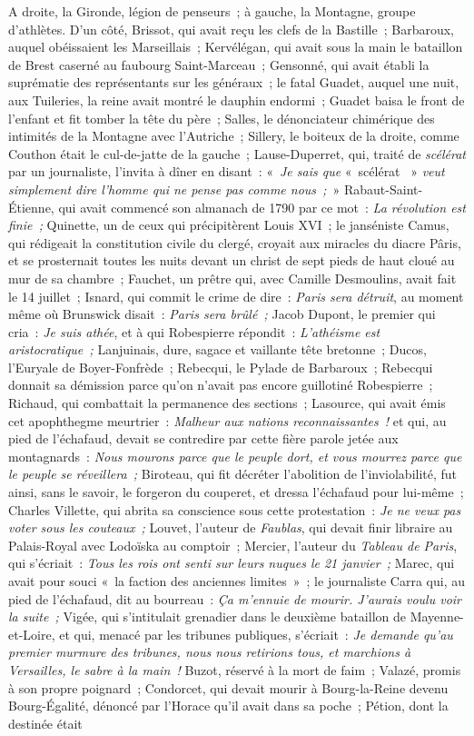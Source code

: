 \documentclass[french,twoside]{book} %
\begin{document}
A droite, la Gironde, légion de penseurs ; à gauche, la Montagne, groupe d’athlètes. D’un côté, Brissot, qui avait reçu les clefs de la Bastille ; Barbaroux, auquel obéissaient les Marseillais ; Kervélégan, qui avait sous la main le bataillon de Brest caserné au faubourg Saint-Marceau ; Gensonné, qui avait établi la suprématie des représentants sur les généraux ; le fatal Guadet, auquel une nuit, aux Tuileries, la reine avait montré le dauphin endormi ; Guadet baisa le front de l’enfant et fit tomber la tête du père ; Salles, le dénonciateur chimérique des intimités de la Montagne avec l’Autriche ; Sillery, le boiteux de la droite, comme Couthon était le cul-de-jatte de la gauche ; Lause-Duperret, qui, traité de \emph{scélérat} par un journaliste, l’invita à dîner en disant : « \emph{Je sais que} « scélérat  » \emph{veut simplement dire l’homme qui ne pense pas comme nous ;} » Rabaut-Saint-Étienne, qui avait commencé son almanach de 1790 par ce mot : \emph{La révolution est finie ;} Quinette, un de ceux qui précipitèrent Louis XVI ; le janséniste Camus, qui rédigeait la constitution civile du clergé, croyait aux miracles du diacre Pâris, et se prosternait toutes les nuits devant un christ de sept pieds de haut cloué au mur de sa chambre ; Fauchet, un prêtre qui, avec Camille Desmoulins, avait fait le 14 juillet ; Isnard, qui commit le crime de dire : \emph{Paris sera détruit}, au moment même où Brunswick disait : \emph{Paris sera brûlé ;} Jacob Dupont, le premier qui cria : \emph{Je suis athée}, et à qui Robespierre répondit : \emph{L’athéisme est aristocratique ;} Lanjuinais, dure, sagace et vaillante tête bretonne ; Ducos, l’Euryale de Boyer-Fonfrède ; Rebecqui, le Pylade de Barbaroux ; Rebecqui donnait sa démission parce qu’on n’avait pas encore guillotiné Robespierre ; Richaud, qui combattait la permanence des sections ; Lasource, qui avait émis cet apophthegme meurtrier : \emph{Malheur aux nations reconnaissantes !} et qui, au pied de l’échafaud, devait se contredire par cette fière parole jetée aux montagnards : \emph{Nous mourons parce que le peuple dort, et vous mourrez parce que le peuple se réveillera ;} Biroteau, qui fit décréter l’abolition de l’inviolabilité, fut ainsi, sans le savoir, le forgeron du couperet, et dressa l’échafaud pour lui-même ; Charles Villette, qui abrita sa conscience sous cette protestation : \emph{Je ne veux pas voter sous les couteaux ;} Louvet, l’auteur de \emph{Faublas}, qui devait finir libraire au Palais-Royal avec  Lodoïska au comptoir ; Mercier, l’auteur du \emph{Tableau de Paris}, qui s’écriait : \emph{Tous les rois ont senti sur leurs nuques le 21 janvier ;} Marec, qui avait pour souci « la faction des anciennes limites » ; le journaliste Carra qui, au pied de l’échafaud, dit au bourreau : \emph{Ça m’ennuie de mourir. J’aurais voulu voir la suite ;} Vigée, qui s’intitulait grenadier dans le deuxième bataillon de Mayenne-et-Loire, et qui, menacé par les tribunes publiques, s’écriait : \emph{Je demande qu’au premier murmure des tribunes, nous nous retirions tous, et marchions à Versailles, le sabre à la main !} Buzot, réservé à la mort de faim ; Valazé, promis à son propre poignard ; Condorcet, qui devait mourir à Bourg-la-Reine devenu Bourg-Égalité, dénoncé par l’Horace qu’il avait dans sa poche ; Pétion, dont la destinée était 
\end{document}
